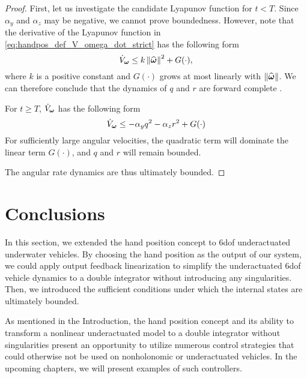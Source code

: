 \begin{proof}
    First, let us investigate the candidate Lyapunov function for $t < T$.
    Since $\alpha_y$ and $\alpha_z$ may be negative, we cannot prove boundedness.
    However, note that the derivative of the Lyapunov function in \eqref{eq:handpos_def_V_omega_dot_strict} has the following form
    \begin{equation}
        \dot{V}_{\bm{\omega}} \leq k \left\|\widehat{\bm{\omega}}\right\|^2 + G(\cdot),
    \end{equation}
    where $k$ is a positive constant and $G(\cdot)$ grows at most linearly with $\left\|\widehat{\bm{\omega}}\right\|$.
    We can therefore conclude that the dynamics of $q$ and $r$ are forward complete \cite{angeli_forward_1999}.

    For $t \geq T$, $\dot{V}_{\bm{\omega}}$ has the following form
    \begin{equation}
        \dot{V}_{\bs{\omega}} \leq -\alpha_yq^2 - \alpha_zr^2 + G(\cdot)%
    \end{equation}
    For sufficiently large angular velocities, the quadratic term will dominate the linear term $G(\cdot)$, and $q$ and $r$ will remain bounded.
    
    The angular rate dynamics are thus ultimately bounded.        
\end{proof}

\section{Conclusions}
\label{sec:handpos_def_conclusion}
In this section, we extended the hand position concept to 6\gls{dof} underactuated underwater vehicles.
By choosing the hand position as the output of our system, we could apply output feedback linearization to simplify the underactuated 6\gls{dof} vehicle dynamics to a double integrator without introducing any singularities.
Then, we introduced the sufficient conditions under which the internal states are ultimately bounded.

As mentioned in the Introduction, the hand position concept and its ability to transform a nonlinear underactuated model to a double integrator without singularities present an opportunity to utilize numerous control strategies that could otherwise not be used on nonholonomic or underactuated vehicles.
In the upcoming chapters, we will present examples of such controllers.

